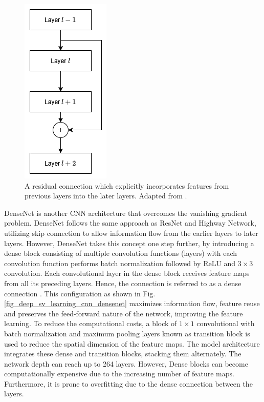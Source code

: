 \documentclass[preprint,12pt]{elsarticle}
\begin{document}
\begin{figure}[h!]
    \centering
    \includegraphics[scale=0.5]{fig_deep_sv_learning_cnn_resnet.png}
    \caption{A residual connection which explicitly incorporates features from previous layers into the later layers. Adapted from \citep{he_deep_2015}.}
    \label{fig_deep_sv_learning_cnn_resnet}
\end{figure}

DenseNet is another CNN architecture that overcomes the vanishing gradient problem. DenseNet follows the same approach as ResNet and Highway Network, utilizing skip connection to allow information flow from the earlier layers to later layers. However, DenseNet takes this concept one step further, by introducing a dense block consisting of multiple convolution functions (layers) with each convolution function performs batch normalization followed by ReLU and $3 \times 3$ convolution. Each convolutional layer in the dense block receives feature maps from all its preceding layers. Hence, the connection is referred to as a dense connection \citep{huang_densely_2017}. This configuration as shown in Fig. \ref{fig_deep_sv_learning_cnn_densenet} maximizes information flow, feature reuse and preserves the feed-forward nature of the network, improving the feature learning. To reduce the computational costs, a block of $1 \times 1$ convolutional with batch normalization and maximum pooling layers known as transition block is used to reduce the spatial dimension of the feature maps. The model architecture integrates these dense and transition blocks, stacking them alternately. The network depth can reach up to 264 layers. However, Dense blocks can become computationally expensive due to the increasing number of feature maps. Furthermore, it is prone to overfitting due to the dense connection between the layers.
\end{document}
